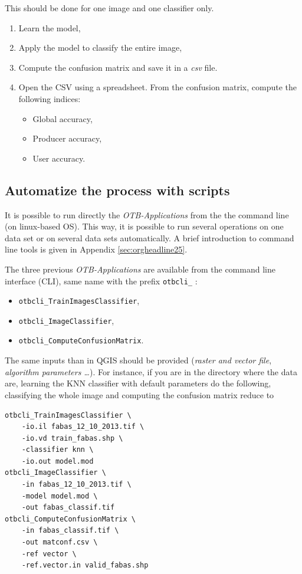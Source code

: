 \documentclass[a4paper,11pt,DIV=18]{scrartcl}
\begin{document}
\begin{work}
This should be done for one image and one classifier only.
\begin{enumerate}
\item Learn the model,
\item Apply the model to classify the entire image,
\item Compute the confusion matrix and save it in a \emph{csv} file.
\item Open  the CSV  using a spreadsheet.   From the  confusion matrix,
compute the following indices:
\begin{itemize}
\item Global accuracy,
\item Producer accuracy,
\item User accuracy.
\end{itemize}
\end{enumerate}
\end{work}

\subsection{Automatize the process with scripts}
\label{sec:orgheadline30}
It  is possible  to run  directly  the \emph{OTB-Applications}  from the  the
command line  (on linux-based  OS). This  way, it  is possible  to run
several  operations  on   one  data  set  or  on   several  data  sets
automatically.  A brief introduction to command line tools is given in
Appendix \ref{sec:orgheadline25}.

The  three previous  \emph{OTB-Applications} are  available from  the command
line interface (CLI), same name with the prefix \texttt{otbcli\_} :

\begin{itemize}
\item \texttt{otbcli\_TrainImagesClassifier},
\item \texttt{otbcli\_ImageClassifier},
\item \texttt{otbcli\_ComputeConfusionMatrix}.
\end{itemize}

The same  inputs than in  QGIS should  be provided (\emph{raster  and vector
file},  \emph{algorithm parameters  \ldots{}}). For  instance,  if you  are in  the
directory where the data are, learning the KNN classifier with default
parameters do the following, classifying the whole image and computing
the confusion matrix reduce to

\begin{verbatim}
otbcli_TrainImagesClassifier \
    -io.il fabas_12_10_2013.tif \
    -io.vd train_fabas.shp \
    -classifier knn \
    -io.out model.mod
otbcli_ImageClassifier \
    -in fabas_12_10_2013.tif \
    -model model.mod \
    -out fabas_classif.tif
otbcli_ComputeConfusionMatrix \
    -in fabas_classif.tif \
    -out matconf.csv \
    -ref vector \
    -ref.vector.in valid_fabas.shp
\end{verbatim}
\end{document}
